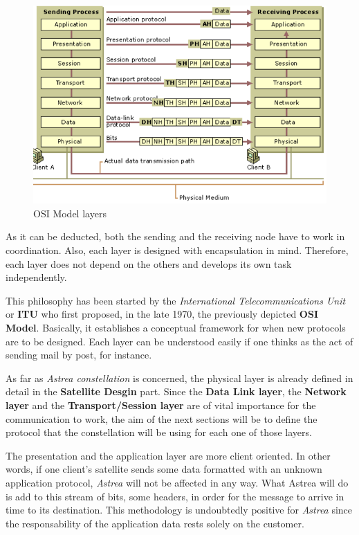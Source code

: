 \begin{figure}[H]
\centering
\includegraphics[scale=0.8]{./sections/CommunicationsDept/OSI}
\caption{OSI Model layers}
\label{fig:osi}
\end{figure}

As it can be deducted, both the sending and the receiving node have to work in coordination. Also, each layer is designed with encapsulation in mind. Therefore, each layer does not depend on the others and develops its own task independently.

This philosophy has been started by the \textit{International Telecommunications Unit} or \textbf{ITU} who first proposed, in the late 1970, the previously depicted \textbf{OSI Model}. Basically, it establishes a conceptual framework for when new protocols are to be designed. Each layer can be understood easily if one thinks as the act of sending mail by post, for instance.

As far as \textit{Astrea constellation} is concerned, the physical layer is already defined in detail in the \textbf{Satellite Desgin} part. Since the\textbf{ Data Link layer}, the \textbf{Network layer} and the \textbf{Transport/Session layer} are of vital importance for the communication to work, the aim of the next sections will be to define the protocol that the constellation will be using for each one of those layers.

The presentation and the application layer are more client oriented. In other words, if one client's satellite sends some data formatted with an unknown application protocol, \textit{Astrea} will not be affected in any way. What Astrea will do is add to this stream of bits, some headers, in order for the message to arrive in time to its destination. This methodology is undoubtedly positive for \textit{Astrea} since the responsability of the application data rests solely on the customer.